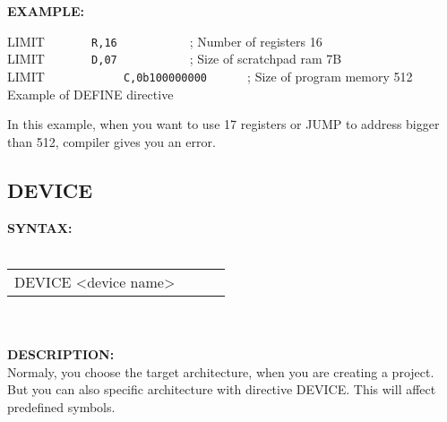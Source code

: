 {                \textbf{EXAMPLE:}\\
                                \begin{code}[h!]
                                { \color{highlight_directive} LIMIT }   \verb`     `
                                { \color{highlight_symbol}\verb' R,16' }  \verb`          `   { \color{highlight_comment} ; Number of registers 16 }\\
                                { \color{highlight_directive} LIMIT }   \verb`     `
                                { \color{highlight_symbol}\verb' D,07' }  \verb`          `   { \color{highlight_comment} ; Size of scratchpad ram 7B }\\
                                { \color{highlight_directive} LIMIT }   \verb`          `
                                { \color{highlight_symbol}\verb' C,0b100000000' }  \verb`     `   { \color{highlight_comment} ; Size of program memory 512}\\
                                \caption{Example of DEFINE directive}
                                \end{code}
                In this example, when you want to use 17 registers or JUMP to address bigger than 512, compiler gives you an error.

                \subsection{DEVICE}
                \textbf{SYNTAX:}\\
                \\ {
                    \texttt{}
                    \begin{tabular}[h!]{llll}
                            { \color{highlight_directive} DEVICE } { \color{highlight_symbol} <device name> }
                            { \color{highlight_comment}  }\\
                    \end{tabular}
                    }\\
                    \\
                \textbf{DESCRIPTION:}\\
                Normaly, you choose the target architecture, when you are creating a project. But you can also specific architecture with directive DEVICE.
                This will affect predefined symbols.\\

}
